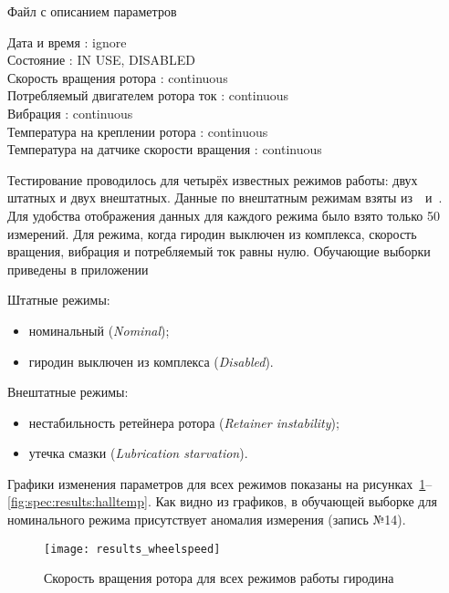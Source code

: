 \begin{algorithm}[h]
\caption{Файл с описанием параметров}
\label{lst:spec:results:params}
\raggedright
\addtolength{\leftskip}{5mm}
\smallskip
Дата и время : ignore \\
Состояние : IN USE, DISABLED \\
Скорость вращения ротора : continuous \\
Потребляемый двигателем ротора ток : continuous \\
Вибрация : continuous \\
Температура на креплении ротора : continuous \\
Температура на датчике скорости вращения : continuous \\
\end{algorithm}

Тестирование проводилось для четырёх известных режимов работы: двух штатных и двух внештатных. Данные по внештатным режимам взяты из~\cite{ISSCMGFailureAnalysis}~и~\cite{ISSCMGLessonsLearned}. Для удобства отображения данных для каждого режима было взято только 50 измерений. Для режима, когда гиродин выключен из комплекса, скорость вращения, вибрация и потребляемый ток равны нулю. Обучающие выборки приведены в приложении

Штатные режимы:
\begin{itemize}
	\item номинальный (\textit{Nominal});
	\item гиродин выключен из комплекса (\textit{Disabled}).
\end{itemize}

Внештатные режимы:
\begin{itemize}
	\item нестабильность ретейнера ротора (\textit{Retainer instability});
	\item утечка смазки (\textit{Lubrication starvation}).
\end{itemize}

Графики изменения параметров для всех режимов показаны на рисунках~\ref{fig:spec:results:wheelspeed}--\ref{fig:spec:results:halltemp}. Как видно из графиков, в обучающей выборке для номинального режима присутствует аномалия измерения (запись №14).

\begin{figure}[h]
\texttt{[image: results\_wheelspeed]}
\caption{Скорость вращения ротора для всех режимов работы гиродина}
\label{fig:spec:results:wheelspeed}
\end{figure}

